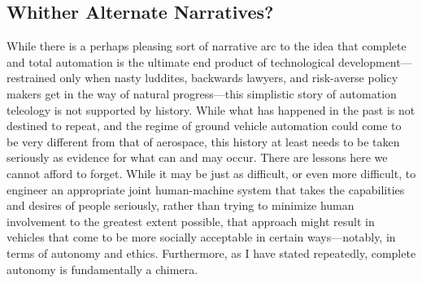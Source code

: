 \subsection{Whither Alternate Narratives?}

While there is a perhaps pleasing sort of narrative arc to the idea
that complete and total automation is the ultimate end product of
technological development---restrained only when nasty luddites, backwards lawyers, and
risk-averse policy makers get in the way of natural progress---this
simplistic story of automation
teleology is not supported by history. While what has happened in the
past is not destined to repeat, and the regime of ground vehicle
automation could come to be very different from that of aerospace,
this history at least needs to be taken seriously as evidence for what
can and may occur. There are lessons here we cannot afford to forget.
While it may be just as difficult, or even more difficult, to engineer
an appropriate joint human-machine system that takes the capabilities
and desires of people seriously, rather than trying to minimize human
involvement to the greatest extent possible, that approach might
result in vehicles that 
come to be more socially acceptable in certain ways---notably, in
terms of autonomy and ethics. Furthermore, as I have stated
repeatedly, complete autonomy is fundamentally a chimera.


